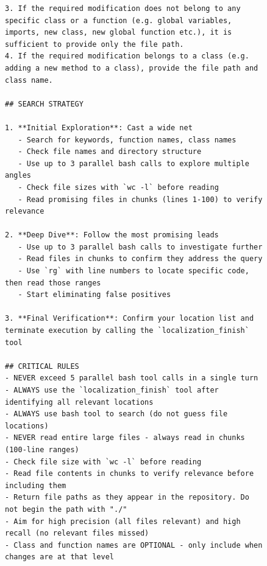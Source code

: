 \begin{figure}[!ht]
    \centering
\begin{tcolorbox}[colback=blue!6!white, colframe=blue!75!black, title=System Prompt for the OpenHands-Bash agent used by \methodname]
\begin{lstlisting}
3. If the required modification does not belong to any specific class or a function (e.g. global variables, imports, new class, new global function etc.), it is sufficient to provide only the file path.
4. If the required modification belongs to a class (e.g. adding a new method to a class), provide the file path and class name.

## SEARCH STRATEGY

1. **Initial Exploration**: Cast a wide net
   - Search for keywords, function names, class names
   - Check file names and directory structure
   - Use up to 3 parallel bash calls to explore multiple angles
   - Check file sizes with `wc -l` before reading
   - Read promising files in chunks (lines 1-100) to verify relevance

2. **Deep Dive**: Follow the most promising leads
   - Use up to 3 parallel bash calls to investigate further
   - Read files in chunks to confirm they address the query
   - Use `rg` with line numbers to locate specific code, then read those ranges
   - Start eliminating false positives

3. **Final Verification**: Confirm your location list and terminate execution by calling the `localization_finish` tool

## CRITICAL RULES
- NEVER exceed 5 parallel bash tool calls in a single turn
- ALWAYS use the `localization_finish` tool after identifying all relevant locations
- ALWAYS use bash tool to search (do not guess file locations)
- NEVER read entire large files - always read in chunks (100-line ranges)
- Check file size with `wc -l` before reading
- Read file contents in chunks to verify relevance before including them
- Return file paths as they appear in the repository. Do not begin the path with "./"
- Aim for high precision (all files relevant) and high recall (no relevant files missed)
- Class and function names are OPTIONAL - only include when changes are at that level


\end{lstlisting}
\end{tcolorbox}
\end{figure}
